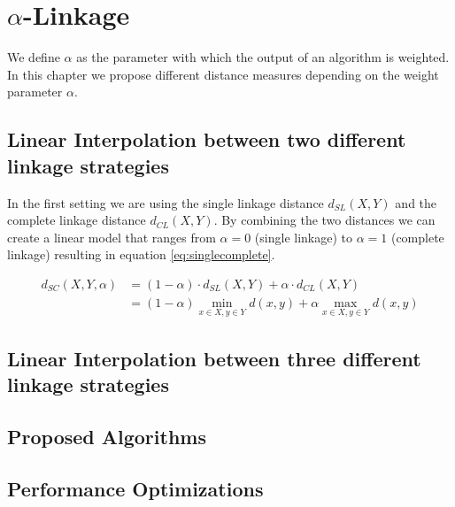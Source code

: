 \chapter{$\alpha$-Linkage}

We define $\alpha$ as the parameter with which the output of an algorithm is weighted. In this chapter we propose different distance measures depending on the weight parameter $\alpha$.

\section{Linear Interpolation between two different linkage strategies}

In the first setting we are using the single linkage distance $d_{SL}(X,Y)$ and the complete linkage distance $d_{CL}(X,Y)$. By combining the two distances we can create a linear model that ranges from $\alpha = 0$ (single linkage) to $\alpha = 1$ (complete linkage) resulting in equation \ref{eq:singlecomplete}.

\begin{equation}
    \begin{aligned}
        d_{SC}(X,Y,\alpha) &= (1 - \alpha) \cdot d_{SL}(X,Y) + \alpha \cdot d_{CL}(X,Y)\\
        &= (1 - \alpha) \min\limits_{x \in X, y \in Y} d(x,y) + \alpha \max\limits_{x \in X, y \in Y} d(x,y)
    \end{aligned}
    \label{eq:singlecomplete}
\end{equation}

\section{Linear Interpolation between three different linkage strategies}

\section{Proposed Algorithms}

\section{Performance Optimizations}